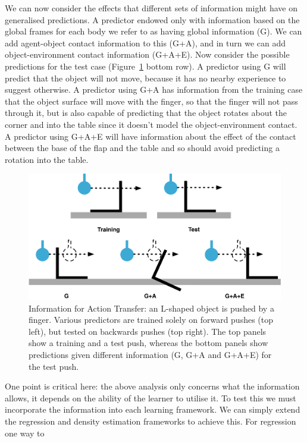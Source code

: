 We can now consider the effects that different sets of information
might have on generalised predictions. A predictor endowed only with
information based on the global frames for each body we refer to as
having global information (G). We can add agent-object contact
information to this (G+A), and in turn we can add object-environment
contact information (G+A+E). Now consider the possible predictions for the test case (Figure~\ref{fig:ToyExample} bottom row). A predictor
using G will predict that the object will not move, because it has no
nearby experience to suggest otherwise. A predictor using G+A has
information from the training case that the object surface will move
with the finger, so that the finger will not pass through it, but is
also capable of predicting that the object rotates about the corner
and into the table since it doesn't model the object-environment
contact. A predictor using G+A+E will have information about the
effect of the contact between the base of the flap and the table and
so should avoid predicting a rotation into the table.
\begin{figure}[t]
\centerline{\includegraphics[width=\columnwidth]{BackPushToyExample}}
\caption[ToyExample]{Information for Action Transfer: an L-shaped object is pushed by a finger. Various predictors are trained solely on forward pushes (top left), but tested on backwards pushes (top right). The top panels show a training and a test push, whereas the bottom panels show predictions given different information (G, G+A and G+A+E) for the test push.}
\label{fig:ToyExample}
\end{figure}
One point is critical here: the above analysis only concerns what the
information allows, it depends on the ability of the learner to
utilise it.  To test this we must incorporate the information into
each learning framework. We can simply extend the regression and density
estimation frameworks to achieve this. For regression one way to
